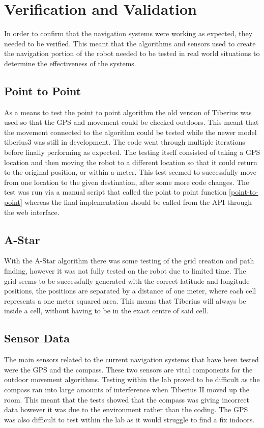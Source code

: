 \section{Verification and Validation}
In order to confirm that the navigation systems were working as expected, they needed to be verified. This meant that the algorithms and sensors used to create the navigation portion of the robot needed to be tested in real world situations to determine the effectiveness of the systems.
\subsection{Point to Point}
As a means to test the point to point algorithm the old version of Tiberius was used so that the \gls{GPS} and movement could be checked outdoors. This meant that the movement connected to the algorithm could be tested while the newer model \gls{tiberius3} was still in development. The code went through multiple iterations before finally performing as expected. The testing itself consisted of taking a \gls{GPS} location and then moving the robot to a different location so that it could return to the original position, or within a meter. This test seemed to successfully move from one location to the given destination, after some more code changes. The test was run via a manual script that called the point to point function \ref{point-to-point} whereas the final implementation should be called from the API through the web interface.
\subsection{A-Star}
With the A-Star algorithm there was some testing of the grid creation and path finding, however it was not fully tested on the robot due to limited time. The grid seems to be successfully generated with the correct latitude and longitude positions, the positions are separated by a distance of one meter, where each cell represents a one meter squared area. This means that Tiberius will always be inside a cell, without having to be in the exact centre of said cell.
\subsection{Sensor Data}
The main sensors related to the current navigation systems that have been tested were the \gls{GPS} and the compass. These two sensors are vital components for the outdoor movement algorithms. Testing within the lab proved to be difficult as the compass ran into large amounts of interference when Tiberius II moved up the room. This meant that the tests showed that the compass was giving incorrect data however it was due to the environment rather than the coding. The \gls{GPS} was also difficult to test within the lab as it would struggle to find a fix indoors. 